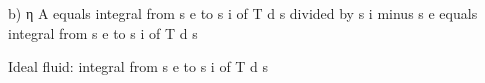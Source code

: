 b) η A equals integral from s e to s i of T d s divided by s i minus s e equals integral from s e to s i of T d s

Ideal fluid: integral from s e to s i of T d s